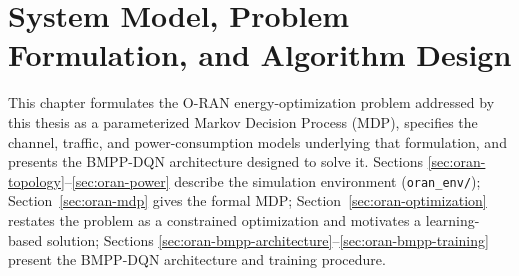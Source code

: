 %
%
%

\chapter{System Model, Problem Formulation, and Algorithm Design}
\label{chap:oran-system-model}

This chapter formulates the O-RAN energy-optimization problem addressed by
this thesis as a parameterized Markov Decision Process (MDP), specifies the
channel, traffic, and power-consumption models underlying that formulation,
and presents the BMPP-DQN architecture designed to solve it. Sections
\ref{sec:oran-topology}--\ref{sec:oran-power} describe the simulation
environment (\texttt{oran\_env/}); Section~\ref{sec:oran-mdp} gives the
formal MDP; Section~\ref{sec:oran-optimization} restates the problem as a
constrained optimization and motivates a learning-based solution; Sections
\ref{sec:oran-bmpp-architecture}--\ref{sec:oran-bmpp-training} present the
BMPP-DQN architecture and training procedure.

